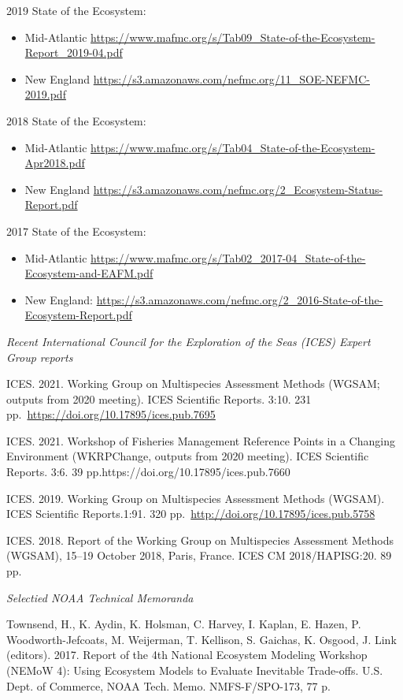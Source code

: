 \documentclass[11pt, a4paper]{awesome-cv}
\providecommand{\tightlist}{%
	\setlength{\itemsep}{0pt}\setlength{\parskip}{0pt}}
\begin{document}
2019 State of the Ecosystem:

\begin{itemize}
\tightlist
\item
  Mid-Atlantic
  \url{https://www.mafmc.org/s/Tab09_State-of-the-Ecosystem-Report_2019-04.pdf}
\item
  New England
  \url{https://s3.amazonaws.com/nefmc.org/11_SOE-NEFMC-2019.pdf}
\end{itemize}

2018 State of the Ecosystem:

\begin{itemize}
\tightlist
\item
  Mid-Atlantic
  \url{https://www.mafmc.org/s/Tab04_State-of-the-Ecosystem-Apr2018.pdf}
\item
  New England
  \url{https://s3.amazonaws.com/nefmc.org/2_Ecosystem-Status-Report.pdf}
\end{itemize}

2017 State of the Ecosystem:

\begin{itemize}
\tightlist
\item
  Mid-Atlantic
  \url{https://www.mafmc.org/s/Tab02_2017-04_State-of-the-Ecosystem-and-EAFM.pdf}
\item
  New England:
  \url{https://s3.amazonaws.com/nefmc.org/2_2016-State-of-the-Ecosystem-Report.pdf}
\end{itemize}

\emph{Recent International Council for the Exploration of the Seas
(ICES) Expert Group reports}

ICES. 2021. Working Group on Multispecies Assessment Methods (WGSAM;
outputs from 2020 meeting). ICES Scientific Reports. 3:10. 231
pp.~\url{https://doi.org/10.17895/ices.pub.7695}

ICES. 2021. Workshop of Fisheries Management Reference Points in a
Changing Environment (WKRPChange, outputs from 2020 meeting). ICES
Scientific Reports. 3:6. 39 pp.https://doi.org/10.17895/ices.pub.7660

ICES. 2019. Working Group on Multispecies Assessment Methods (WGSAM).
ICES Scientific Reports.1:91. 320
pp.~\url{http://doi.org/10.17895/ices.pub.5758}

ICES. 2018. Report of the Working Group on Multispecies Assessment
Methods (WGSAM), 15--19 October 2018, Paris, France. ICES CM
2018/HAPISG:20. 89 pp.

\emph{Selectied NOAA Technical Memoranda}

Townsend, H., K. Aydin, K. Holsman, C. Harvey, I. Kaplan, E. Hazen, P.
Woodworth-Jefcoats, M. Weijerman, T. Kellison, S. Gaichas, K. Osgood, J.
Link (editors). 2017. Report of the 4th National Ecosystem Modeling
Workshop (NEMoW 4): Using Ecosystem Models to Evaluate Inevitable
Trade-offs. U.S. Dept. of Commerce, NOAA Tech. Memo. NMFS-F/SPO-173, 77
p.
\end{document}

